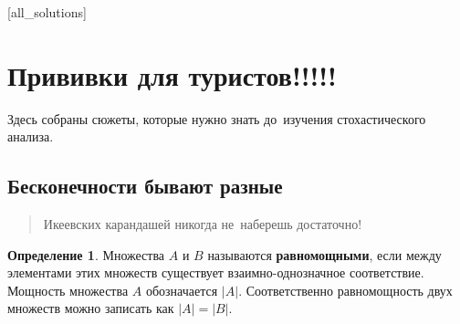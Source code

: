 \documentclass[pdftex, 12pt, a4paper]{article}
\theoremstyle{definition} %
\newtheorem*{mydef}{Определение}
\numberwithin{problem}{section}
\newcommand{\indef}[1]{\textbf{#1}}
\numberwithin{blits}{section}
\begin{document}
[all_solutions]


\section{Прививки для туристов!!!!!}



Здесь собраны сюжеты, которые нужно знать до~изучения стохастического анализа.

\subsection{Бесконечности бывают разные}

\begin{quote}Икеевских карандашей никогда не~наберешь достаточно!
\end{quote}

\begin{mydef}\label{aaa}
Множества $A$ и $B$ называются \indef{равномощными}, если между элементами этих множеств существует взаимно-однозначное соответствие. Мощность множества $A$ обозначается $|A|$. Соответственно равномощность двух множеств можно записать как $|A|=|B|$.
\end{mydef}
\end{document}
